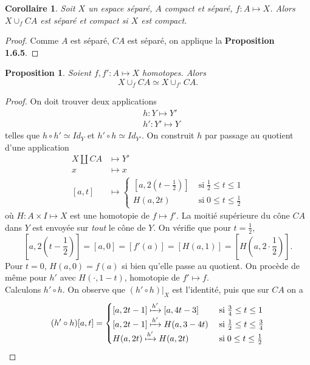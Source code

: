 \documentclass[12pt]{book}
\newtheorem{cor}[lemma]{Corollaire}
\newtheorem{prop}[lemma]{Proposition}
\theoremstyle{definition}
\theoremstyle{remark}
\begin{document}
	\begin{cor}
		Soit $X$ un espace séparé, $A$ compact et séparé, $f : A\longmapsto X$. Alors $X \cup_f CA$ est séparé et compact si $X$ est compact.
	\end{cor}
	\begin{proof}
		Comme $A$ est séparé, $CA$ est séparé, on applique la \textbf{Proposition 1.6.5}.
	\end{proof}
	\begin{prop}
		Soient $f,f' : A \longmapsto X$ homotopes. Alors \[
			X \cup_f CA \simeq X \cup_{f'} CA
		.\] 
	\end{prop}
	\begin{proof}
		On doit trouver deux applications
		\begin{align*}
			&h : Y \longmapsto Y' \\
			&h' : Y' \longmapsto Y
		\end{align*}
		telles que $h\circ h' \simeq Id_Y$ et $h'\circ h \simeq Id_{Y'}$. 
		On construit $h$ par passage au quotient d'une application 
		 \begin{align*}
			 X \amalg CA &\longmapsto Y' \\
				 x&\longmapsto x \\
				 [a,t]& \longmapsto \begin{cases}
					 [a,2(t-\frac{1}{2})] \; &\text{si} \; \frac{1}{2} \le t \le 1 \\
					 H(a,2t) \; &\text{si} \; 0 \le t \le \frac{1}{2}
			 \end{cases}
		\end{align*}
		où $H : A \times I \longmapsto X$ est une homotopie de $f \longmapsto f'$.
		La moitié supérieure du cône $CA$ dans $Y$ est envoyée sur \emph{tout} le cône de $Y$. On vérifie que pour $t=\frac{1}{2}$, \[[a,2(t-\frac{1}{2})] = [a,0] = [f'(a)] = [H(a,1)] = [H(a,2\cdot \frac{1}{2})].\]
		Pour $t=0$, $H(a,0) = f(a)$ si bien qu'elle passe au quotient. On procède de même pour $h'$ avec $H(\cdot , 1-t)$, homotopie de  $f' \longmapsto f$. \\
		Calculons $h' \circ h$. On observe que $(h'\circ h)|_X$ est l'identité, puis que sur $CA$ on a \[
			(h'\circ h)[a,t] = \begin{cases}
				[a,2t-1] \xmapsto{h'} [a,4t-3] \; &\text{si} \; \frac{3}{4} \le t \le 1 \\
				[a,2t-1] \xmapsto{h'} H(a,3-4t) \; &\text{si} \; \frac{1}{2} \le t \le \frac{3}{4} \\
				H(a,2t) \xmapsto{h'} H(a,2t) \; &\text{si} \; 0 \le t \le \frac{1}{2}
			\end{cases}
\]
\end{proof}
\end{document}

